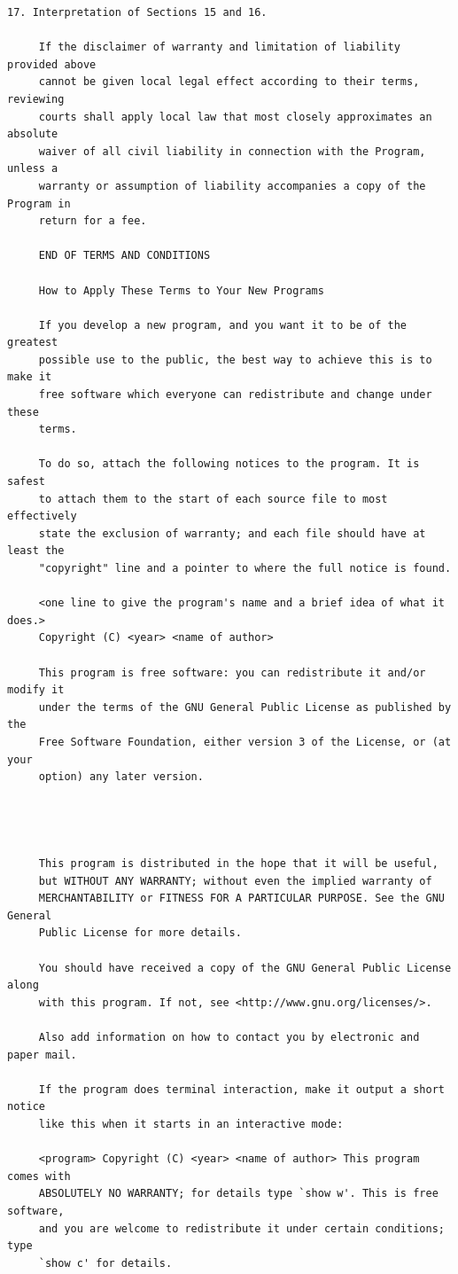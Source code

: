 \begin{lstlisting}[basicstyle=\ttfamily\footnotesize,breaklines=true]
     17. Interpretation of Sections 15 and 16.

     If the disclaimer of warranty and limitation of liability provided above
     cannot be given local legal effect according to their terms, reviewing
     courts shall apply local law that most closely approximates an absolute
     waiver of all civil liability in connection with the Program, unless a
     warranty or assumption of liability accompanies a copy of the Program in
     return for a fee.

     END OF TERMS AND CONDITIONS

     How to Apply These Terms to Your New Programs

     If you develop a new program, and you want it to be of the greatest
     possible use to the public, the best way to achieve this is to make it
     free software which everyone can redistribute and change under these
     terms.

     To do so, attach the following notices to the program. It is safest
     to attach them to the start of each source file to most effectively
     state the exclusion of warranty; and each file should have at least the
     "copyright" line and a pointer to where the full notice is found.

     <one line to give the program's name and a brief idea of what it does.>
     Copyright (C) <year> <name of author>

     This program is free software: you can redistribute it and/or modify it
     under the terms of the GNU General Public License as published by the
     Free Software Foundation, either version 3 of the License, or (at your
     option) any later version.




     This program is distributed in the hope that it will be useful,
     but WITHOUT ANY WARRANTY; without even the implied warranty of
     MERCHANTABILITY or FITNESS FOR A PARTICULAR PURPOSE. See the GNU General
     Public License for more details.

     You should have received a copy of the GNU General Public License along
     with this program. If not, see <http://www.gnu.org/licenses/>.

     Also add information on how to contact you by electronic and paper mail.

     If the program does terminal interaction, make it output a short notice
     like this when it starts in an interactive mode:

     <program> Copyright (C) <year> <name of author> This program comes with
     ABSOLUTELY NO WARRANTY; for details type `show w'. This is free software,
     and you are welcome to redistribute it under certain conditions; type
     `show c' for details.


\end{lstlisting}
